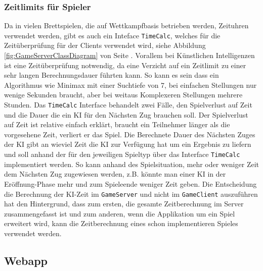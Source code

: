 \documentclass[12pt,a4paper,bibliography=totocnumbered,listof=totocnumbered]{article}
\begin{document}
\subsubsection{Zeitlimits für Spieler}
Da in vielen Brettspielen, die auf Wettkampfbasis betrieben werden, Zeituhren verwendet werden, gibt es auch ein Inteface \texttt{TimeCalc}, welches
für die Zeitüberprüfung für der Clients verwendet wird, siehe Abbildung \ref{fig:GameServerClassDiagram} von Seite \pageref{fig:GameServerClassDiagram}. 
Vorallem bei Künstlichen Intelligenzen ist eine Zeitüberprüfung notwendig, da eine Verzicht auf ein 
Zeitlimit zu einer sehr langen Berechnungsdauer führten kann. So kann es sein dass ein Algorithmus wie Minimax mit einer Suchtiefe von 7, bei einfachen
Stellungen nur wenige Sekunden braucht, aber bei weitaus Komplexeren Stellungen mehrere Stunden. 
Das \texttt{TimeCalc} Interface behandelt zwei Fälle, den Spielverlust auf Zeit und die 
Dauer die ein KI für den Nächsten Zug brauchen soll. Der Spielverlust auf Zeit ist relative einfach erklärt, braucht ein Teilnehmer länger als 
die vorgesehene Zeit, verliert er das Spiel. Die Berechnete Dauer des Nächsten Zuges der KI gibt an wieviel Zeit die KI zur Verfügung hat um ein
Ergebnis zu liefern und soll anhand der für den jeweiligen Spieltyp über das 
Interface \texttt{TimeCalc} implementiert werden. So kann anhand des Spielsituation, mehr oder weniger Zeit dem Nächsten Zug zugewiesen werden, 
z.B. könnte man einer KI in der Eröffnung-Phase mehr und zum Spieleende weniger Zeit geben. 
Die Entscheidung die Berechnung der KI-Zeit im \texttt{GameServer} und nicht im \texttt{GameClient} auszuführen hat den Hintergrund, 
dass zum ersten, die gesamte Zeitberechnung im Server zusammengefasst ist und zum anderen, wenn die Applikation um ein Spiel erweitert wird, kann
die Zeitberechnung eines schon implementieren Spieles verwendet werden.

\subsection{Webapp}
\end{document}
